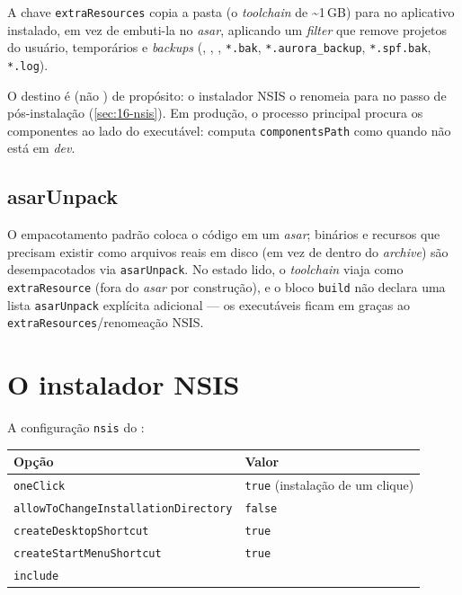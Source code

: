 A chave \texttt{extraResources} copia a pasta  (o
\emph{toolchain} de \textasciitilde{}1\,GB) para  no aplicativo
instalado, em vez de embuti-la no \emph{asar}, aplicando um \emph{filter} que
remove projetos do usuário, temporários e \emph{backups}
(, , , \texttt{*.bak},
\texttt{*.aurora\_backup}, \texttt{*.spf.bak}, \texttt{*.log}).

\begin{nota}
O destino é  (não ) de propósito: o
instalador NSIS o renomeia para  no passo de pós-instalação
(\autoref{sec:16-nsis}). Em produção, o processo principal procura os componentes
ao lado do executável:  computa \texttt{componentsPath} como
 quando não está em \emph{dev}.
\end{nota}

\subsection{asarUnpack}

O empacotamento padrão coloca o código em um \emph{asar}; binários e recursos que
precisam existir como arquivos reais em disco (em vez de dentro do \emph{archive})
são desempacotados via \texttt{asarUnpack}. No estado lido, o \emph{toolchain}
viaja como \texttt{extraResource} (fora do \emph{asar} por construção), e o bloco
\texttt{build} não declara uma lista \texttt{asarUnpack} explícita adicional ---
os executáveis ficam em  graças ao
\texttt{extraResources}/renomeação NSIS.

\section{O instalador NSIS}
\label{sec:16-nsis}

A configuração \texttt{nsis} do :

\begin{tabularx}{\linewidth}{l Y}
\toprule
\textbf{Opção} & \textbf{Valor} \\
\midrule
\texttt{oneClick}                       & \lstinline|true| (instalação de um clique) \\
\texttt{allowToChangeInstallationDirectory} & \lstinline|false| \\
\texttt{createDesktopShortcut}          & \lstinline|true| \\
\texttt{createStartMenuShortcut}        & \lstinline|true| \\
\texttt{include}                        &  \\
\bottomrule
\end{tabularx}

